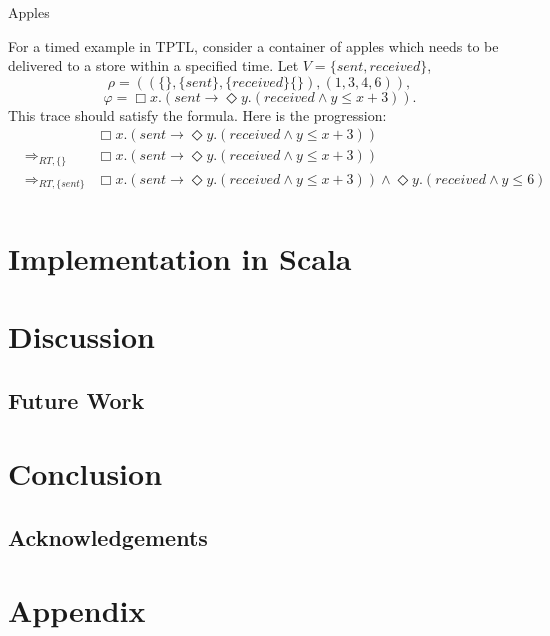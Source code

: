 \documentclass[a4paper]{article}
\newcommand{\rw}[1]{\Rightarrow_{#1}}
\begin{document}
\begin{eg}{Apples}

  For a timed example in TPTL, consider a container of apples which needs to be delivered to a store within a specified time. Let $V=\{sent, received\}$, \[\rho=((\{\},\{sent\},\{received\}\{\}),(1,3,4,6)),\] \[\varphi=\Box x. (sent \to \Diamond y. (received \land y \leq x + 3)).\]
  This trace should satisfy the formula.
  Here is the progression:
  \begin{align}
    &&\Box x. (sent \to \Diamond y. (received \land y \leq x + 3))\nonumber\\
    &\rw{RT,\{\}}
    &\Box x. (sent \to \Diamond y. (received \land y \leq x + 3))
    \label{rw3}\\
    &\rw{RT,\{sent\}}
    &\Box x. (sent \to \Diamond y. (received \land y \leq x + 3)) \land \Diamond y. (received \land y \leq 6)
    \label{rw4}\\
  \end{align}
\end{eg}


\section{Implementation in Scala}

\section{Discussion}
\subsection{Future Work}
\section{Conclusion}
\subsection{Acknowledgements}

\nocite{*}
\printbibliography{}
\newpage
\section{Appendix}\label{appendix}
\end{document}
